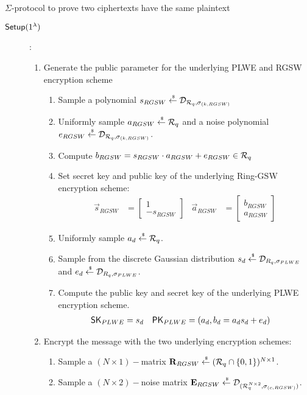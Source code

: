 \begin{section}{$\Sigma$-protocol to prove two ciphertexts have the same plaintext}
  \begin{description}
    \item [${\mathsf{Setup}}(1^\lambda)$]:
    \begin{enumerate}
      \item Generate the public parameter for the underlying PLWE and RGSW encryption scheme
      \begin{enumerate}
        \item Sample a polynomial $s_{RGSW} \stackrel{{\scriptscriptstyle \mkern4mu \$}}{\gets} \mathcal{D}_{{\mathcal{R}}_q, \sigma_{(k,RGSW)}}$
        \item Uniformly sample $a_{RGSW} \stackrel{{\scriptscriptstyle \mkern4mu \$}}{\gets} {\mathcal{R}}_q$ and a noise polynomial $e_{RGSW} \stackrel{{\scriptscriptstyle \mkern4mu \$}}{\gets} \mathcal{D}_{{\mathcal{R}}_q, \sigma_{(k, RGSW)}}$.
        \item Compute $b_{RGSW} = s_{RGSW} \cdot a_{RGSW} + e_{RGSW} \in {\mathcal{R}}_q$
        \item Set secret key and public key of the underlying Ring-GSW encryption scheme:
          \begin{align*}
            \vec{s}_{RGSW} &= \begin{bmatrix} 1 \\ -s_{RGSW} \end{bmatrix}  & \vec{a}_{RGSW} &=  \begin{bmatrix} b_{RGSW} \\ a_{RGSW}\end{bmatrix}
          \end{align*}
        \item Uniformly sample $a_d \stackrel{{\scriptscriptstyle \mkern4mu \$}}{\gets} {\mathcal{R}}_q$.
        \item Sample from the discrete Gaussian distribution $s_d \stackrel{{\scriptscriptstyle \mkern4mu \$}}{\gets} \mathcal{D}_{R_q, \sigma_{PLWE}}$ and $e_d \stackrel{{\scriptscriptstyle \mkern4mu \$}}{\gets} \mathcal{D}_{R_q, \sigma_{PLWE}}$.
        \item Compute the public key and secret key of the underlying PLWE encryption scheme.
        \begin{align*}
          \mathsf{SK}_{PLWE} &= s_d & \mathsf{PK}_{PLWE} &= (a_d, b_d = a_d s_d + e_d)
        \end{align*}
      \end{enumerate}
      \item Encrypt the message with the two underlying encryption schemes:
        \begin{enumerate}
        \item Sample a $(N \times 1)-$matrix $\mathbf{R}_{RGSW} \stackrel{{\scriptscriptstyle \mkern4mu \$}}{\gets} ({\mathcal{R}}_q \cap\{0,1\})^{N \times 1}$.
        \item Sample a $(N \times 2)-$noise matrix $\mathbf{E}_{RGSW} \stackrel{{\scriptscriptstyle \mkern4mu \$}}{\gets} \mathcal{D}_{({\mathcal{R}}_q^{N \times 2}, \sigma_{(c, RGSW)})}$.

\end{enumerate}
\end{enumerate}
\end{description}
\end{section}
